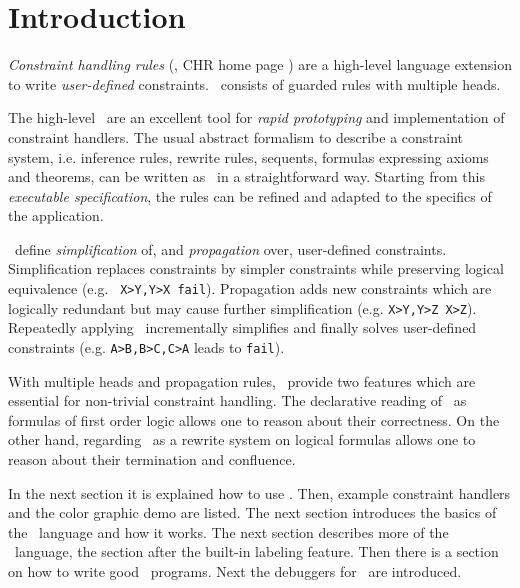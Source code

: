 \section{Introduction}

{\em Constraint handling rules} (\chrs,
CHR home page )
\cite{fru92}
are a high-level language
extension to write {\em user-defined} constraints. \chrs\ 
consists of guarded rules with multiple heads.

The high-level \chrs\ are an excellent tool for {\em rapid prototyping} and
implementation of constraint handlers. The usual abstract formalism to
describe a constraint system, i.e. inference rules, rewrite rules,
sequents, formulas expressing axioms and theorems, can be written as
\chrs\ in a straightforward way.  Starting from this {\em executable
specification}, the rules can be refined and adapted
to the specifics of the application.  

\chrs\ define {\em simplification} of, and {\em propagation} over, 
user-defined constraints.  Simplification replaces constraints by
simpler constraints while preserving logical equivalence (e.g.  {\tt
X>Y,Y>X
\rep fail}).  Propagation adds new constraints which are logically
redundant but may cause further simplification (e.g. {\tt X>Y,Y>Z \aug
X>Z}).  Repeatedly applying \chrs\ incrementally simplifies and
finally solves user-defined constraints (e.g. {\tt A>B,B>C,C>A}
leads to {\tt fail}).  

With multiple heads and propagation rules,
\chrs\ provide two features which are essential for non-trivial
constraint handling.
The declarative reading of
\chrs\ as formulas of first order logic 
allows one to reason about their correctness.  On the other hand, 
regarding \chrs\ as a rewrite system on logical formulas allows one to
reason about their termination and confluence.


In the next section
it is explained how to use \chrs.
 Then,
example constraint handlers and the color graphic
demo are listed.
 The next
section introduces the basics of the \chr\ language and how it works.  
The next section describes more of the \chr\ language,
the section after the built-in labeling feature.
Then there is
a section on how to write good \chr\ programs.  Next the debuggers for
\chrs\ are introduced.  


